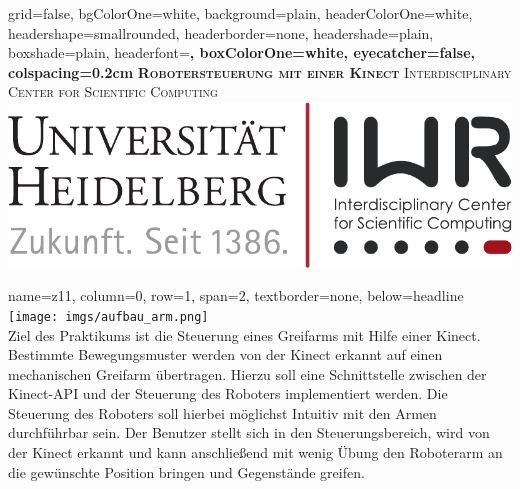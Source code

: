 \documentclass[portrait,a0paper]{baposter}
\begin{document}
\begin{poster}
  {
  grid=false,
  bgColorOne=white,
  background=plain,
  headerColorOne=white,
  headershape=smallrounded,
  headerborder=none,
  headershade=plain,
  boxshade=plain,
  headerfont=\Large\bf\textsf,
  boxColorOne=white,
  eyecatcher=false,
  colspacing=0.2cm
  }
  { } 
 {\bf\textsc{Robotersteuerung mit einer Kinect}\vspace{0.5em}}
  {
  \textsc{Interdisciplinary Center for Scientific Computing}  \vspace*{0.5em} \\

  }
  {%
    \includegraphics[scale=0.5]{imgs/IWR_Logo.pdf}
  }
 
 
    {
    name=z11,
    column=0,
    row=1,
    span=2,
    textborder=none,
    below=headline
    }
    {
    \texttt{[image: imgs/aufbau\_arm.png]}\\
Ziel des Praktikums ist die Steuerung eines Greifarms mit Hilfe einer Kinect.
Bestimmte Bewegungsmuster werden von der Kinect erkannt auf einen mechanischen Greifarm übertragen.
Hierzu soll eine Schnittstelle zwischen der Kinect-API und der Steuerung des Roboters implementiert werden.
Die Steuerung des Roboters soll hierbei möglichst Intuitiv mit den Armen durchführbar sein.
Der Benutzer stellt sich in den Steuerungsbereich, wird von der Kinect erkannt und kann anschließend mit wenig Übung den Roboterarm an die gewünschte Position bringen und Gegenstände greifen.
 }


\end{poster}
\end{document}
